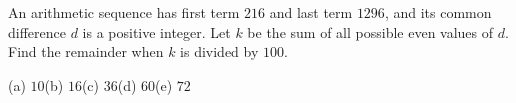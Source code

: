 An arithmetic sequence has first term $216$ and last term $1296$, and its common difference $d$ is a positive integer. Let $k$ be the sum of all possible even values of $d$. Find the remainder when $k$ is divided by $100$.

(a) $10$\quad (b) $16$\quad (c) $36$\quad (d) $60$\quad (e) $72$
